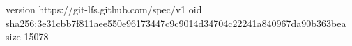 version https://git-lfs.github.com/spec/v1
oid sha256:3e31cbb7f811aee550e96173447c9c9014d34704c22241a840967da90b363bea
size 15078
